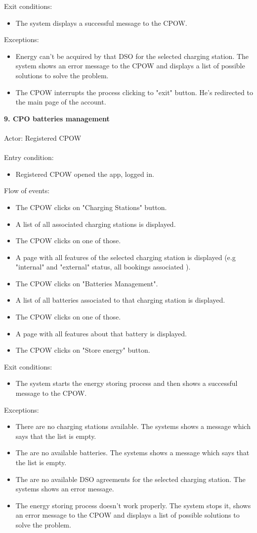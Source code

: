 \documentclass[a4paper]{report}
\begin{document}
Exit conditions:
\begin{itemize}
\item The system displays a successful message to the CPOW.
\end{itemize}
Exceptions:
\begin{itemize}
\item Energy can't be acquired by that DSO for the selected charging station. The system shows an error message to the CPOW and displays a list of possible solutions to solve the problem.
\item The CPOW interrupts the process clicking to "exit" button. He's redirected to the main page of the account.
\end{itemize}
\textbf{9. CPO batteries management}\label{uc:8}
\\ \\
Actor: Registered CPOW \\ \\
Entry condition:
\begin{itemize}
\item Registered CPOW opened the app, logged in.
\end{itemize}
Flow of events:
\begin{itemize}
\item The CPOW clicks on "Charging Stations" button.
\item A list of all associated charging stations is displayed.
\item The CPOW clicks on one of those.
\item A page with all features of the selected charging station is displayed (e.g "internal" and "external" status, all bookings associated ).
\item The CPOW clicks on "Batteries Management".
\item A list of all batteries associated to that charging station is displayed.
\item The CPOW clicks on one of those.
\item A page with all features about that battery is displayed.
\item The CPOW clicks on "Store energy" button.
\end{itemize}
Exit conditions:
\begin{itemize}
\item The system starts the energy storing process and then shows a successful message to the CPOW.
\end{itemize}
Exceptions:
\begin{itemize}
\item There are no charging stations available. The systems shows a message which says that
the list is empty.
\item The are no available batteries. The systems shows a message which says that the list is empty.
\item The are no available DSO agreements for the selected charging station. The systems shows an error message.
\item The energy storing process doesn't work properly. The system stops it, shows an error message to the CPOW and displays a list of possible solutions to solve the problem.
\end{itemize}
\end{document}
